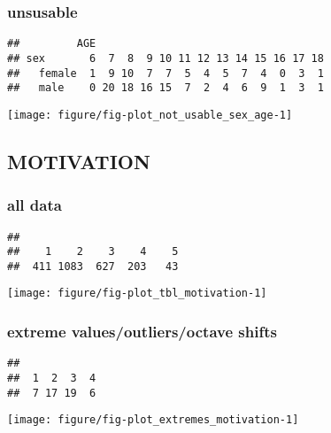 \documentclass[a4]{article}\usepackage[]{graphicx}\usepackage[]{color}
\makeatletter
\def\maxwidth{ %
  \ifdim\Gin@nat@width>\linewidth
    \linewidth
  \else
    \Gin@nat@width
  \fi
}
\newenvironment{kframe}{%
 \def\at@end@of@kframe{}%
 \ifinner\ifhmode%
  \def\at@end@of@kframe{\end{minipage}}%
  \begin{minipage}{\columnwidth}%
 \fi\fi%
 \def\FrameCommand##1{\hskip\@totalleftmargin \hskip-\fboxsep
 \colorbox{shadecolor}{##1}\hskip-\fboxsep
     \hskip-\linewidth \hskip-\@totalleftmargin \hskip\columnwidth}%
 \MakeFramed {\advance\hsize-\width
   \@totalleftmargin\z@ \linewidth\hsize
   \@setminipage}}%
 {\par\unskip\endMakeFramed%
 \at@end@of@kframe}
\newenvironment{knitrout}{}{} %
\makeatother
\begin{document}
\subsubsection{unsusable}
\begin{knitrout}
\color{fgcolor}\begin{kframe}
\begin{verbatim}
##         AGE
## sex       6  7  8  9 10 11 12 13 14 15 16 17 18
##   female  1  9 10  7  7  5  4  5  7  4  0  3  1
##   male    0 20 18 16 15  7  2  4  6  9  1  3  1
\end{verbatim}
\end{kframe}
\end{knitrout}
\begin{knitrout}
\color{fgcolor}
\texttt{[image: figure/fig-plot\_not\_usable\_sex\_age-1]} 

\end{knitrout}
\clearpage

\subsection{MOTIVATION}
\subsubsection{all data}
\begin{knitrout}
\color{fgcolor}\begin{kframe}
\begin{verbatim}
## 
##    1    2    3    4    5 
##  411 1083  627  203   43
\end{verbatim}
\end{kframe}
\end{knitrout}
\begin{knitrout}
\color{fgcolor}
\texttt{[image: figure/fig-plot\_tbl\_motivation-1]} 

\end{knitrout}
\clearpage
\subsubsection{extreme values/outliers/octave shifts}
\begin{knitrout}
\color{fgcolor}\begin{kframe}
\begin{verbatim}
## 
##  1  2  3  4 
##  7 17 19  6
\end{verbatim}
\end{kframe}
\end{knitrout}
\begin{knitrout}
\color{fgcolor}
\texttt{[image: figure/fig-plot\_extremes\_motivation-1]} 

\end{knitrout}
\clearpage
\end{document}

